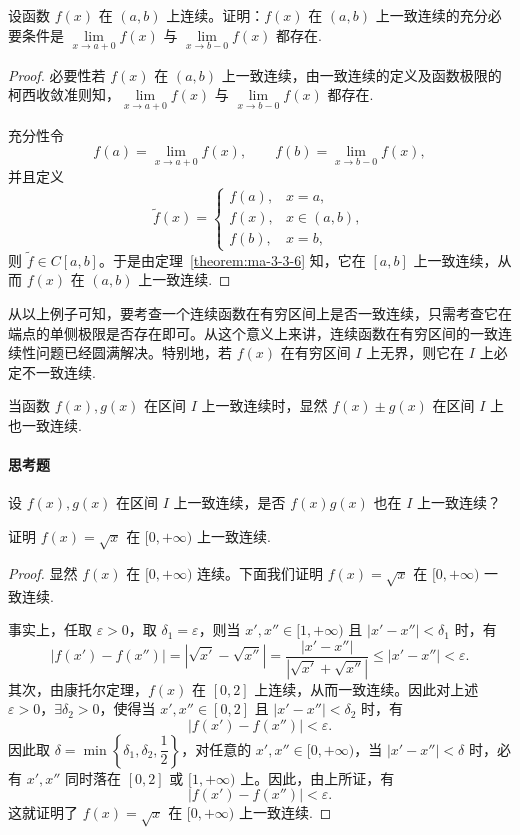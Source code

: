 \begin{example}\label{example:ma-3-3-9}
设函数 $f(x)$ 在 $(a,b)$ 上连续。证明：$f(x)$ 在 $(a,b)$ 上一致连续的充分必要条件是 $\lim\limits_{x\to a+0}f(x)$ 与 $\lim\limits_{x\to b-0}f(x)$ 都存在.
\end{example}


\begin{proof}
必要性\quad 若 $f(x)$ 在 $(a,b)$ 上一致连续，由一致连续的定义及函数极限的柯西收敛准则知，$\lim\limits_{x\to a+0}f(x)$ 与 $\lim\limits_{x\to b-0}f(x)$ 都存在.

充分性\quad 令
\[
  f(a)=\lim_{x\to a+0}f(x),\qquad f(b)=\lim_{x\to b-0}f(x),
\]
并且定义
\[
  \tilde f(x)=
  \begin{cases}
    f(a), & x=a,\\
    f(x), & x\in(a,b),\\
    f(b), & x=b,
  \end{cases}
\]
则 $\tilde f\in C[a,b]$。于是由定理~\ref{theorem:ma-3-3-6} 知，它在 $[a,b]$ 上一致连续，从而 $f(x)$ 在 $(a,b)$ 上一致连续.
\end{proof}


\begin{remark}\label{remark:ma-3-source-120}
从以上例子可知，要考查一个连续函数在有穷区间上是否一致连续，只需考查它在端点的单侧极限是否存在即可。从这个意义上来讲，连续函数在有穷区间的一致连续性问题已经圆满解决。特别地，若 $f(x)$ 在有穷区间 $I$ 上无界，则它在 $I$ 上必定不一致连续.
\end{remark}

当函数 $f(x),g(x)$ 在区间 $I$ 上一致连续时，显然 $f(x)\pm g(x)$ 在区间 $I$ 上也一致连续.

\paragraph*{思考题}
设 $f(x),g(x)$ 在区间 $I$ 上一致连续，是否 $f(x)g(x)$ 也在 $I$ 上一致连续？

\begin{example}\label{example:ma-3-3-10}
证明 $f(x)=\sqrt{x}$ 在 $[0,+\infty)$ 上一致连续.
\end{example}


\begin{proof}
显然 $f(x)$ 在 $[0,+\infty)$ 连续。下面我们证明 $f(x)=\sqrt{x}$ 在 $[0,+\infty)$ 一致连续.

事实上，任取 $\varepsilon>0$，取 $\delta_1=\varepsilon$，则当 $x',x''\in[1,+\infty)$ 且 $|x'-x''|<\delta_1$ 时，有
\[
  |f(x')-f(x'')|
  =
  |\sqrt{x'}-\sqrt{x''}|
  =
  \frac{|x'-x''|}{|\sqrt{x'}+\sqrt{x''}|}
  \leqslant |x'-x''|<\varepsilon.
\]
其次，由康托尔定理，$f(x)$ 在 $[0,2]$ 上连续，从而一致连续。因此对上述 $\varepsilon>0$，$\exists\delta_2>0$，使得当 $x',x''\in[0,2]$ 且 $|x'-x''|<\delta_2$ 时，有
\[
  |f(x')-f(x'')|<\varepsilon.
\]
因此取 $\delta=\min\left\{\delta_1,\delta_2,\dfrac12\right\}$，对任意的 $x',x''\in[0,+\infty)$，当 $|x'-x''|<\delta$ 时，必有 $x',x''$ 同时落在 $[0,2]$ 或 $[1,+\infty)$ 上。因此，由上所证，有
\[
  |f(x')-f(x'')|<\varepsilon.
\]
这就证明了 $f(x)=\sqrt{x}$ 在 $[0,+\infty)$ 上一致连续.
\end{proof}


